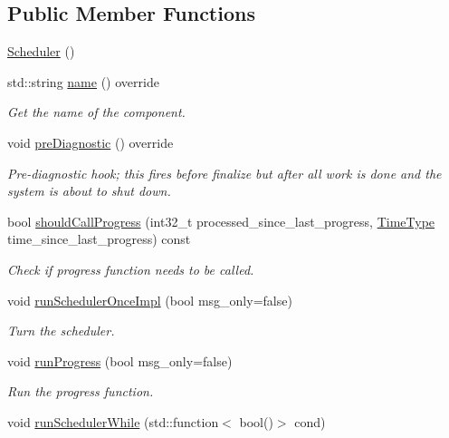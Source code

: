 \subsection*{Public Member Functions}
\begin{DoxyCompactItemize}
\item 
\hyperlink{structvt_1_1sched_1_1_scheduler_a54b61f09996bca1d5ed5332e1a4e2b60}{Scheduler} ()
\item 
std\+::string \hyperlink{structvt_1_1sched_1_1_scheduler_a60d76cb810df35be76d414226c24d6c4}{name} () override
\begin{DoxyCompactList}\small\item\em Get the name of the component. \end{DoxyCompactList}\item 
void \hyperlink{structvt_1_1sched_1_1_scheduler_a42835a58f541dd65cecd4d393fe78a81}{pre\+Diagnostic} () override
\begin{DoxyCompactList}\small\item\em Pre-\/diagnostic hook; this fires before finalize but after all work is done and the system is about to shut down. \end{DoxyCompactList}\item 
bool \hyperlink{structvt_1_1sched_1_1_scheduler_aa1e901f6264aa52d918f4c64802e54b5}{should\+Call\+Progress} (int32\+\_\+t processed\+\_\+since\+\_\+last\+\_\+progress, \hyperlink{namespacevt_a876a9d0cd5a952859c72de8a46881442}{Time\+Type} time\+\_\+since\+\_\+last\+\_\+progress) const
\begin{DoxyCompactList}\small\item\em Check if progress function needs to be called. \end{DoxyCompactList}\item 
void \hyperlink{structvt_1_1sched_1_1_scheduler_a991208100bd8be482164303b7d8135ad}{run\+Scheduler\+Once\+Impl} (bool msg\+\_\+only=false)
\begin{DoxyCompactList}\small\item\em Turn the scheduler. \end{DoxyCompactList}\item 
void \hyperlink{structvt_1_1sched_1_1_scheduler_a9c9fc08f6d205761ad162d391aaa7927}{run\+Progress} (bool msg\+\_\+only=false)
\begin{DoxyCompactList}\small\item\em Run the progress function. \end{DoxyCompactList}\item 
void \hyperlink{structvt_1_1sched_1_1_scheduler_a9c130fc0ccbf237633420a7aa35069a4}{run\+Scheduler\+While} (std\+::function$<$ bool()$>$ cond)

\end{DoxyCompactItemize}
